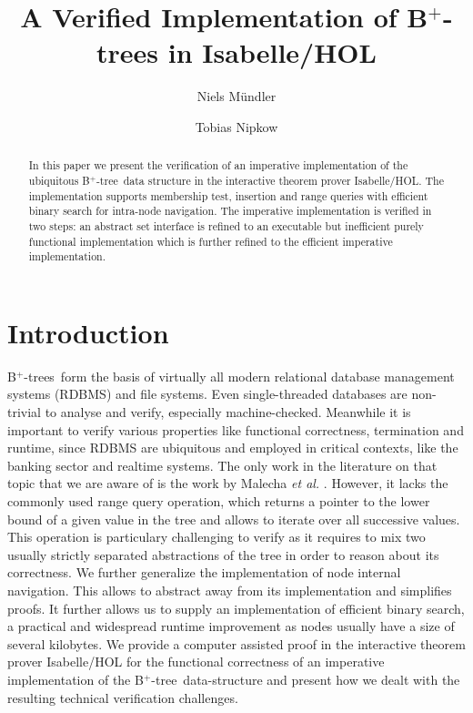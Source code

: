 \documentclass[a4paper,UKenglish,cleveref, cref, thm-restate]{lipics-v2021}
\title{A Verified Implementation of B$^+$-trees in Isabelle/HOL}
\author{Niels Mündler}{Department of Computer Science, ETH Zurich, Switzerland}{nmuendler@ethz.ch}{https://orcid.org/0000-0003-3851-2557}{}%
\author{Tobias Nipkow}{Department of Informatics, Technical University of Munich, Germany}{nipkow@in.tum.de}{https://orcid.org/0000-0003-0730-515X}{}
\newcommand{\btree}{B$^+$-tree}
\newcommand{\btrees}{B$^+$-trees}
\begin{document}
\maketitle

\begin{abstract}
    In this paper we present the verification of an imperative
    implementation of the ubiquitous \btree\ data structure in the
    interactive theorem prover Isabelle/HOL. The implementation supports
    membership test, insertion and range queries with efficient binary
    search for intra-node navigation. The imperative implementation is
    verified in two steps: an abstract set interface is refined to an
    executable but inefficient purely functional implementation which is further
    refined to the efficient imperative implementation.
\end{abstract}

\section{Introduction}
\label{sec:introduction}

\btrees\ form the basis of virtually all modern relational database management systems (RDBMS)
and file systems.
Even single-threaded databases are non-trivial to analyse and verify,
especially machine-checked.
Meanwhile it is important to verify various properties like functional correctness,
termination and runtime,
since RDBMS are ubiquitous and employed in critical contexts,
like the banking sector and realtime systems.
The only work in the literature on that topic that we are aware of
is the work by Malecha \emph{et al.} \cite{DBLP:conf/popl/MalechaMSW10}.
However, it lacks the commonly used range
query operation, which returns a pointer to the lower bound of a given value
in the tree
and allows to iterate over all successive values.
This operation is particulary challenging to verify as it requires
to mix two usually strictly separated abstractions of the tree
in order to reason about its correctness.
We further generalize the implementation of node internal
navigation.
This allows to abstract away from its implementation
and simplifies proofs.
It further allows us to supply an implementation of
efficient binary search, a practical and widespread runtime improvement
as nodes usually have a size of several kilobytes.
We provide a computer assisted proof in the interactive
theorem prover Isabelle/HOL \cite{DBLP:books/sp/NipkowK14} for the functional
correctness of an imperative implementation of the \btree\ data-structure
and present how we dealt with the resulting technical verification challenges.
\end{document}

